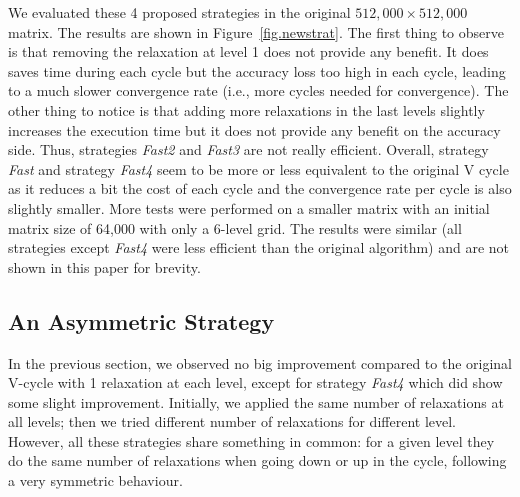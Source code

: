 
We evaluated these 4 proposed strategies in the original $512,000\times
512,000$ matrix.  The results are shown in Figure~\ref{fig.newstrat}.  The
first thing to observe is that removing the relaxation at level 1 does not
provide any benefit. It does saves time during each cycle but the accuracy loss
too high in each cycle, leading to a much slower convergence rate (i.e., more
cycles needed for convergence).  The other thing to notice is that adding more
relaxations in the last levels slightly increases the execution time but it
does not provide any benefit on the accuracy side. Thus, strategies
\emph{Fast2} and \emph{Fast3} are not really efficient.  Overall, strategy \emph{Fast} and strategy
\emph{Fast4} seem to be more or less equivalent to the original V cycle as it
reduces a bit the cost of each cycle and the convergence rate per cycle is also
slightly smaller.  More tests were performed on a smaller matrix with an
initial matrix size of 64,000 with only a 6-level grid. The results were
similar (all strategies except \emph{Fast4} were less efficient than the original algorithm) and are not shown in this paper for brevity.




\subsection{An Asymmetric Strategy}
\label{sec.assymetric}

In the previous section, we observed no big improvement compared to the
original V-cycle with 1 relaxation at each level, except for strategy
\emph{Fast4} which did show some slight improvement. Initially, we applied the
same number of relaxations at all levels; then we tried different number of
relaxations for different level. However, all these strategies share something
in common: for a given level they do the same number of relaxations when going
down or up in the cycle, following a very symmetric behaviour.

